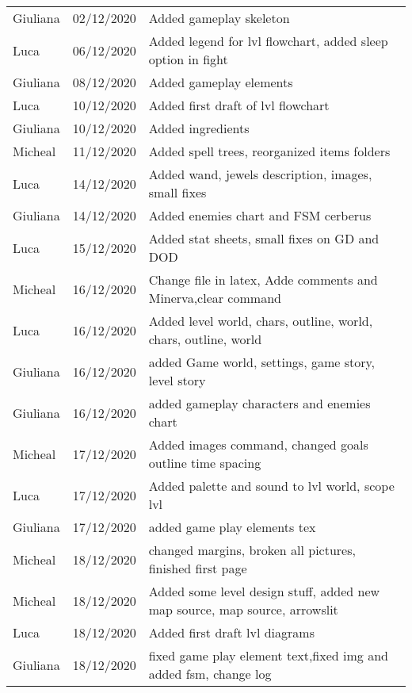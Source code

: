 \begin{tabular}{l l l}
Giuliana & 02/12/2020 &  Added gameplay skeleton\\
Luca & 06/12/2020 & Added legend for lvl flowchart, added sleep option in fight \\
Giuliana & 08/12/2020 & Added gameplay elements\\
Luca & 10/12/2020 & Added first draft of lvl flowchart\\
Giuliana & 10/12/2020 & Added ingredients\\
Micheal & 11/12/2020 & Added spell trees, reorganized items folders\\
Luca & 14/12/2020 &Added wand, jewels description, images, small fixes \\
Giuliana & 14/12/2020 & Added enemies chart and FSM cerberus\\
Luca & 15/12/2020 &  Added stat sheets, small fixes on GD and DOD\\
Micheal & 16/12/2020 & Change file in latex, Adde comments and Minerva,clear command \\
Luca & 16/12/2020 & Added level world, chars, outline, world, chars, outline, world\\
Giuliana & 16/12/2020 & added Game world, settings, game story, level story\\
Giuliana & 16/12/2020 & added gameplay characters and enemies chart\\
Micheal & 17/12/2020 & Added images command, changed goals outline time spacing\\
Luca & 17/12/2020 & Added palette and sound to lvl world, scope lvl\\
Giuliana & 17/12/2020 & added game play elements tex\\
Micheal & 18/12/2020 & changed margins, broken all pictures, finished first page \\
Micheal & 18/12/2020 & Added some level design stuff, added new map source, map source, arrowslit\\
Luca & 18/12/2020 & Added first draft lvl diagrams\\
Giuliana & 18/12/2020 & fixed game play element text,fixed img and added fsm, change log\\
\end{tabular}